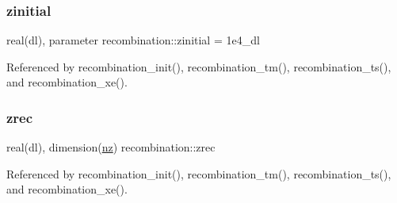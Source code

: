 \subsubsection{\texorpdfstring{zinitial}{zinitial}}
{\footnotesize\ttfamily real(dl), parameter recombination\+::zinitial = 1e4\+\_\+dl\hspace{0.3cm}{\ttfamily [private]}}



Referenced by recombination\+\_\+init(), recombination\+\_\+tm(), recombination\+\_\+ts(), and recombination\+\_\+xe().

\mbox{\label{namespacerecombination_ace51a9fec7f3c178e99caf82c7cc6de0}} 
\subsubsection{\texorpdfstring{zrec}{zrec}}
{\footnotesize\ttfamily real(dl), dimension(\mbox{\hyperlink{namespacerecombination_a2ebf98b22953bfe18fb372dd8e330d3e}{nz}}) recombination\+::zrec\hspace{0.3cm}{\ttfamily [private]}}



Referenced by recombination\+\_\+init(), recombination\+\_\+tm(), recombination\+\_\+ts(), and recombination\+\_\+xe().

